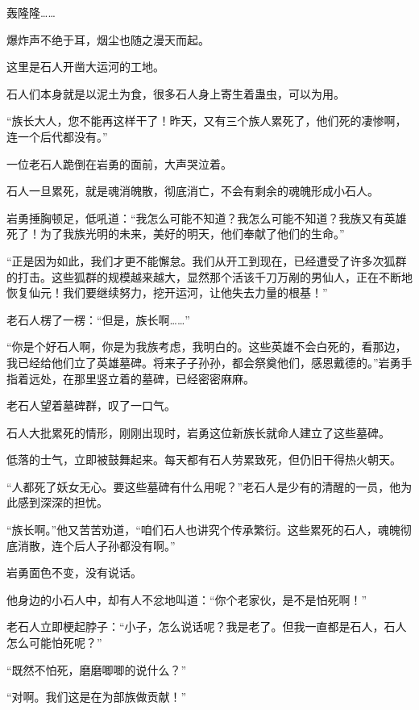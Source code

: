 
\begin{this_body}



轰隆隆……

爆炸声不绝于耳，烟尘也随之漫天而起。

这里是石人开凿大运河的工地。

石人们本身就是以泥土为食，很多石人身上寄生着蛊虫，可以为用。

“族长大人，您不能再这样干了！昨天，又有三个族人累死了，他们死的凄惨啊，连一个后代都没有。”

一位老石人跪倒在岩勇的面前，大声哭泣着。

石人一旦累死，就是魂消魄散，彻底消亡，不会有剩余的魂魄形成小石人。

岩勇捶胸顿足，低吼道：“我怎么可能不知道？我怎么可能不知道？我族又有英雄死了！为了我族光明的未来，美好的明天，他们奉献了他们的生命。”

“正是因为如此，我们才更不能懈怠。我们从开工到现在，已经遭受了许多次狐群的打击。这些狐群的规模越来越大，显然那个活该千刀万剐的男仙人，正在不断地恢复仙元！我们要继续努力，挖开运河，让他失去力量的根基！”

老石人楞了一楞：“但是，族长啊……”

“你是个好石人啊，你是为我族考虑，我明白的。这些英雄不会白死的，看那边，我已经给他们立了英雄墓碑。将来子子孙孙，都会祭奠他们，感恩戴德的。”岩勇手指着远处，在那里竖立着的墓碑，已经密密麻麻。

老石人望着墓碑群，叹了一口气。

石人大批累死的情形，刚刚出现时，岩勇这位新族长就命人建立了这些墓碑。

低落的士气，立即被鼓舞起来。每天都有石人劳累致死，但仍旧干得热火朝天。

“人都死了妖女无心。要这些墓碑有什么用呢？”老石人是少有的清醒的一员，他为此感到深深的担忧。

“族长啊。”他又苦苦劝道，“咱们石人也讲究个传承繁衍。这些累死的石人，魂魄彻底消散，连个后人子孙都没有啊。”

岩勇面色不变，没有说话。

他身边的小石人中，却有人不忿地叫道：“你个老家伙，是不是怕死啊！”

老石人立即梗起脖子：“小子，怎么说话呢？我是老了。但我一直都是石人，石人怎么可能怕死呢？”

“既然不怕死，磨磨唧唧的说什么？”

“对啊。我们这是在为部族做贡献！”


\end{this_body}
